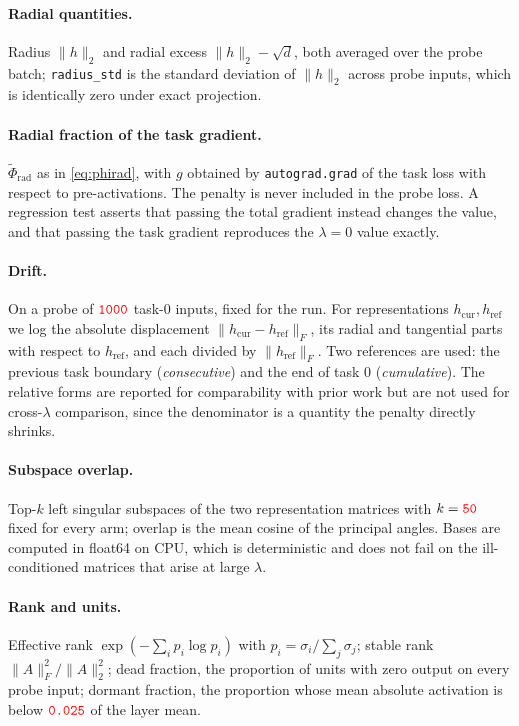 \documentclass[anon]{opt2026}     %
\newcommand{\PH}[1]{\textcolor{red}{\texttt{#1}}}   %
\newcommand{\phirad}{\tilde{\Phi}_{\mathrm{rad}}}
\begin{document}
\paragraph{Radial quantities.} Radius $\|h\|_2$ and radial excess
$\|h\|_2 - \sqrt d$, both averaged over the probe batch; \texttt{radius\_std} is
the standard deviation of $\|h\|_2$ across probe inputs, which is identically
zero under exact projection.

\paragraph{Radial fraction of the task gradient.} $\phirad$ as in
\eqref{eq:phirad}, with $g$ obtained by \texttt{autograd.grad} of the task loss
with respect to pre-activations. The penalty is never included in the probe
loss. A regression test asserts that passing the total gradient instead changes
the value, and that passing the task gradient reproduces the $\lambda = 0$ value
exactly.

\paragraph{Drift.} On a probe of $\PH{1000}$ task-$0$ inputs, fixed for the run.
For representations $h_{\mathrm{cur}}, h_{\mathrm{ref}}$ we log the absolute
displacement $\|h_{\mathrm{cur}} - h_{\mathrm{ref}}\|_F$, its radial and
tangential parts with respect to $h_{\mathrm{ref}}$, and each divided by
$\|h_{\mathrm{ref}}\|_F$. Two references are used: the previous task boundary
(\emph{consecutive}) and the end of task $0$ (\emph{cumulative}). The relative
forms are reported for comparability with prior work but are not used for
cross-$\lambda$ comparison, since the denominator is a quantity the penalty
directly shrinks.

\paragraph{Subspace overlap.} Top-$k$ left singular subspaces of the two
representation matrices with $k = \PH{50}$ fixed for every arm; overlap is the
mean cosine of the principal angles. Bases are computed in float64 on CPU, which
is deterministic and does not fail on the ill-conditioned matrices that arise at
large $\lambda$.

\paragraph{Rank and units.} Effective rank $\exp(-\sum_i p_i \log p_i)$ with
$p_i = \sigma_i/\sum_j \sigma_j$; stable rank $\|A\|_F^2/\|A\|_2^2$; dead
fraction, the proportion of units with zero output on every probe input; dormant
fraction, the proportion whose mean absolute activation is below $\PH{0.025}$ of
the layer mean.
\end{document}
